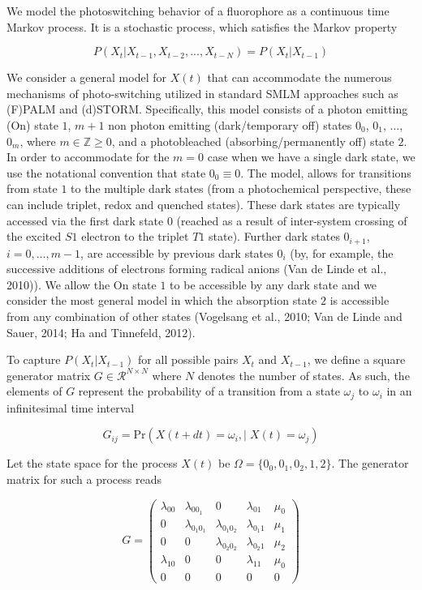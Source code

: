 \documentclass{ucetd}
\begin{document}
We model the photoswitching behavior of a fluorophore as a continuous time Markov process. It is a stochastic process, which satisfies the Markov property

\begin{equation*}
P(X_{t}|X_{t-1}, X_{t-2}, ..., X_{t-N}) = P(X_{t}|X_{t-1})
\end{equation*}

We consider a general model for $X(t)$ that can accommodate the numerous mechanisms of photo-switching utilized in standard SMLM approaches such as (F)PALM and (d)STORM. Specifically, this model consists of a photon emitting (On) state $1$, $m+1$ non photon emitting (dark/temporary off) states $0_0$, $0_1$, $\ldots$, $0_m$, where $m \in \mathbb{Z}{\geq 0}$, and a photobleached (absorbing/permanently off) state $2$. In order to accommodate for the $m = 0$ case when we have a single dark state, we use the notational convention that state $0_0 \equiv 0$. The model, allows for transitions from state $1$ to the multiple dark states (from a photochemical perspective, these can include triplet, redox and quenched states). These dark states are typically accessed via the first dark state $0$ (reached as a result of inter-system crossing of the excited $S1$ electron to the triplet $T1$ state). Further dark states $0_{i+1}$, $i = 0, \ldots, m-1$, are accessible by previous dark states $0_i$ (by, for example, the successive additions of electrons forming radical anions (Van de Linde et al., 2010)). We allow the On state $1$ to be accessible by any dark state and we consider the most general model in which the absorption state $2$ is accessible from any combination of other states (Vogelsang et al., 2010; Van de Linde and Sauer, 2014; Ha and Tinnefeld, 2012).

To capture $P(X_{t}|X_{t-1})$ for all possible pairs $X_{t}$ and $X_{t-1}$, we define a square generator matrix $G\in \mathcal{R}^{N\times N}$ where $N$ denotes the number of states. As such, the elements of $G$ represent the probability of a transition from a state $\omega_{j}$ to $\omega_{i}$ in an infinitesimal time interval

\begin{equation*}
G_{ij} = \mathrm{Pr}\left(X(t+dt)=\omega_{i}, | \;X(t)=\omega_{j}\right)
\end{equation*}

Let the state space for the process $X(t)$ be $\Omega = \{0_{0},0_{1},0_{2},1,2\}$. The generator matrix for such a process reads

\begin{equation*}
G = 
\begin{pmatrix}
\lambda_{00} & \lambda_{0 0_{1}} & 0 & \lambda_{01} & \mu_{0}\\
0 & \lambda_{0_{1}0_{1}} & \lambda_{0_{1}0_{2}} & \lambda_{0_{1}1} & \mu_{1}\\
0 & 0 & \lambda_{0_{2}0_{2}} & \lambda_{0_{2}1} & \mu_{2}\\
\lambda_{10} & 0 & 0 & \lambda_{11} & \mu_{0}\\
0 & 0 & 0 & 0 & 0
\end{pmatrix}
\end{equation*}
\end{document}
